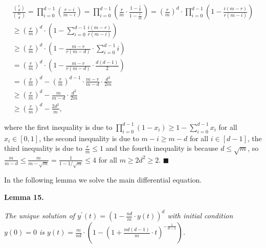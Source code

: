 \[\begin{gathered}
\displaystyle\frac{\binom{r}{d}}{\binom{m}{d}}=\prod_{i=0}^{d-1}\left(\frac{r-i}{m-i}\right)=\prod_{i=0}^{d-1}\left(\frac{r}{m}\cdot\frac{1-\frac{i}{r}}{1-\frac{i}{m}}\right) \displaystyle=\left(\frac{r}{m}\right)^{d}\cdot\prod_{i=0}^{d-1}\left(1-\frac{i(m-r)}{r(m-i)}\right) \\
\displaystyle\geq\left(\frac{r}{m}\right)^{d}\cdot\left(1-\sum_{i=0}^{d-1}\frac{i(m-r)}{r(m-i)}\right) \\
\displaystyle\geq\left(\frac{r}{m}\right)^{d}\cdot\left(1-\frac{m-r}{r(m-d)}\cdot\sum_{i=0}^{d-1}i\right) \\
\displaystyle=\left(\frac{r}{m}\right)^{d}\cdot\left(1-\frac{m-r}{r(m-d)}\cdot\frac{d(d-1)}{2}\right) \\
\displaystyle=\left(\frac{r}{m}\right)^{d}-\left(\frac{r}{m}\right)^{d-1}\cdot\frac{m-r}{m-d}\cdot\frac{d^{2}}{2m} \\
\displaystyle\geq\left(\frac{r}{m}\right)^{d}-\frac{m}{m-d}\cdot\frac{d^{2}}{2m} \\
\displaystyle\geq\left(\frac{r}{m}\right)^{d}-\frac{2d^{2}}{m},
\end{gathered}\]


where the first inequality is due to $\prod_{i=0}^{d-1}(1-x_{i})\geq 1-\sum_{i=0}^{d-1}x_{i}$ for all $x_{i}\in[0,1]$, the second inequality is due to $m-i\geq m-d$ for all $i\in[d-1]$, the third inequality is due to $\frac{r}{m}\leq 1$ and the fourth inequality is because $d\leq\sqrt{m}$, so $\frac{m}{m-d}\leq\frac{m}{m-\sqrt{m}}=\frac{1}{1-1/\sqrt{m}}\leq 4$ for all $m\geq 2d^{2}\geq 2$.
\ensuremath{\blacksquare}\par





In the following lemma we solve the main differential equation.\par





\par\medskip\noindent\textbf{\textbf{Lemma 15}\textbf{.}}\par



\emph{The unique solution of $y^{\prime}(t)=\left(1-\frac{nd}{m}\cdot y(t)\right)^{d}$ with initial condition $y(0)=0$ is
$y(t)=\frac{m}{nd}\cdot\left(1-\left(1+\frac{nd(d-1)}{m}\cdot t\right)^{-\frac{1}{d-1}}\right)$.}\par



